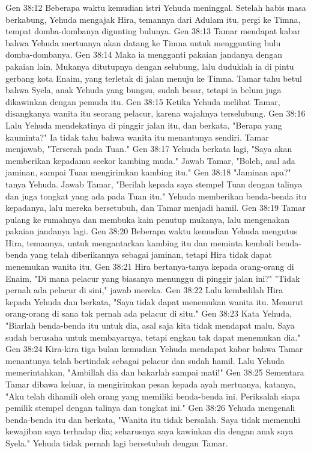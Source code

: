 Gen 38:12  Beberapa waktu kemudian istri Yehuda meninggal. Setelah habis masa berkabung, Yehuda mengajak Hira, temannya dari Adulam itu, pergi ke Timna, tempat domba-dombanya digunting bulunya.
Gen 38:13  Tamar mendapat kabar bahwa Yehuda mertuanya akan datang ke Timna untuk menggunting bulu domba-dombanya.
Gen 38:14  Maka ia mengganti pakaian jandanya dengan pakaian lain. Mukanya ditutupnya dengan selubung, lalu duduklah ia di pintu gerbang kota Enaim, yang terletak di jalan menuju ke Timna. Tamar tahu betul bahwa Syela, anak Yehuda yang bungsu, sudah besar, tetapi ia belum juga dikawinkan dengan pemuda itu.
Gen 38:15  Ketika Yehuda melihat Tamar, disangkanya wanita itu seorang pelacur, karena wajahnya terselubung.
Gen 38:16  Lalu Yehuda mendekatinya di pinggir jalan itu, dan berkata, "Berapa yang kauminta?" Ia tidak tahu bahwa wanita itu menantunya sendiri. Tamar menjawab, "Terserah pada Tuan."
Gen 38:17  Yehuda berkata lagi, "Saya akan memberikan kepadamu seekor kambing muda." Jawab Tamar, "Boleh, asal ada jaminan, sampai Tuan mengirimkan kambing itu."
Gen 38:18  "Jaminan apa?" tanya Yehuda. Jawab Tamar, "Berilah kepada saya stempel Tuan dengan talinya dan juga tongkat yang ada pada Tuan itu." Yehuda memberikan benda-benda itu kepadanya, lalu mereka bersetubuh, dan Tamar menjadi hamil.
Gen 38:19  Tamar pulang ke rumahnya dan membuka kain penutup mukanya, lalu mengenakan pakaian jandanya lagi.
Gen 38:20  Beberapa waktu kemudian Yehuda mengutus Hira, temannya, untuk mengantarkan kambing itu dan meminta kembali benda-benda yang telah diberikannya sebagai jaminan, tetapi Hira tidak dapat menemukan wanita itu.
Gen 38:21  Hira bertanya-tanya kepada orang-orang di Enaim, "Di mana pelacur yang biasanya menunggu di pinggir jalan ini?" "Tidak pernah ada pelacur di sini," jawab mereka.
Gen 38:22  Lalu kembalilah Hira kepada Yehuda dan berkata, "Saya tidak dapat menemukan wanita itu. Menurut orang-orang di sana tak pernah ada pelacur di situ."
Gen 38:23  Kata Yehuda, "Biarlah benda-benda itu untuk dia, asal saja kita tidak mendapat malu. Saya sudah berusaha untuk membayarnya, tetapi engkau tak dapat menemukan dia."
Gen 38:24  Kira-kira tiga bulan kemudian Yehuda mendapat kabar bahwa Tamar menantunya telah bertindak sebagai pelacur dan sudah hamil. Lalu Yehuda memerintahkan, "Ambillah dia dan bakarlah sampai mati!"
Gen 38:25  Sementara Tamar dibawa keluar, ia mengirimkan pesan kepada ayah mertuanya, katanya, "Aku telah dihamili oleh orang yang memiliki benda-benda ini. Periksalah siapa pemilik stempel dengan talinya dan tongkat ini."
Gen 38:26  Yehuda mengenali benda-benda itu dan berkata, "Wanita itu tidak bersalah. Saya tidak memenuhi kewajiban saya terhadap dia; seharusnya saya kawinkan dia dengan anak saya Syela." Yehuda tidak pernah lagi bersetubuh dengan Tamar.
